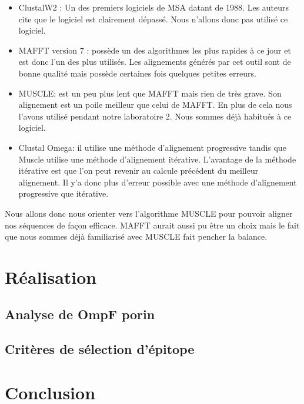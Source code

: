 \documentclass{article}
\begin{document}
 
\begin{itemize}
  \item ClustalW2 : Un des premiers logiciels de MSA datant de 1988. Les auteurs cite que le logiciel est clairement dépassé. Nous n'allons donc pas utilisé ce logiciel. 
  \item MAFFT version 7 : possède un des algorithmes les plus rapides à ce jour et est donc l'un des plus utilisés. Les alignements générés par cet outil sont de bonne qualité mais possède certaines fois quelques petites erreurs.
  
  \item MUSCLE: est un peu plus lent que MAFFT mais rien de très grave. Son alignement est un poile meilleur que celui de MAFFT. En plus de cela nous l'avons utilisé pendant notre laboratoire 2. Nous sommes déjà habitués à ce logiciel. 

	\item Clustal Omega: il utilise une méthode d'alignement progressive tandis que Muscle utilise une méthode d'alignement itérative. L'avantage de la méthode itérative est que l'on peut revenir au calcule précédent du meilleur alignement. Il y'a donc plus d'erreur possible avec une méthode d'alignement progressive que itérative.
	
\end{itemize}

Nous allons donc nous orienter vers l'algorithme MUSCLE pour pouvoir aligner nos séquences de façon efficace. MAFFT aurait aussi pu être un choix mais le fait que nous sommes déjà familiarisé avec MUSCLE fait pencher la balance. 

  \section{Réalisation}
  
    \subsection{Analyse de OmpF porin}
    
    \subsection{Critères de sélection d'épitope}
  
  \section{Conclusion}

  

\nocite{*}
\end{document}
